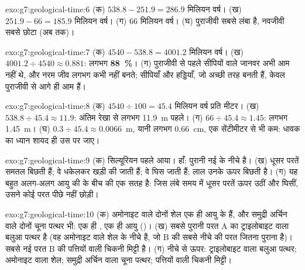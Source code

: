 \begin{solution}{exo:g7:geological-time:6}
(क) $538.8 - 251.9 = 286.9$ मिलियन वर्ष। (ख) $251.9 - 66 = 185.9$
मिलियन वर्ष। (ग) 66 मिलियन वर्ष। (घ) पुराजीवी सबसे लंबा है, नवजीवी सबसे छोटा
(अब तक)।
\end{solution}

\begin{solution}{exo:g7:geological-time:7}
(क) $4540 - 538.8 = 4001.2$ मिलियन वर्ष। (ख) $4001.2 \div 4540
\approx 0.881$:
लगभग \textbf{88~\%}। (ग) पुराजीवी से पहले सीपियों वाले जानवर अभी आम नहीं थे, और
नरम जीव लगभग कभी  नहीं बनते; सीपियाँ और हड्डियाँ, जो अच्छी तरह 
बनती हैं, केवल पुराजीवी से आगे ही आम
हैं।
\end{solution}

\begin{solution}{exo:g7:geological-time:8}
(क) $4540 \div 100 = 45.4$ मिलियन वर्ष प्रति मीटर। (ख) $538.8 \div 45.4
\approx 11.9$:
अंतिम रेखा से लगभग \qty{11.9}{m} पहले। (ग) $66 \div
45.4 \approx 1.45$: लगभग
\qty{1.45}{m}। (घ) $0.3 \div 45.4 \approx
0.0066$~m, यानी लगभग \qty{0.66}{cm},
एक सेंटीमीटर से भी कम: धावक का ध्यान शायद ही उस पर
जाए।
\end{solution}

\begin{solution}{exo:g7:geological-time:9}
(क) सिल्यूरियन पहले आया। हाँ: पुरानी  नई  के नीचे है। (ख) धूसर परतें
समतल बिछती हैं; वे धकेलकर खड़ी की जाती हैं; वे घिस जाती हैं; लाल  उनके ऊपर बिछती
है। (ग) यह बहुत अलग-अलग आयु की  के बीच की एक  सतह है: जिस लंबे समय
में धूसर परतें ऊपर उठीं और घिसीं, उसने कोई परत पीछे नहीं
छोड़ी।
\end{solution}

\begin{solution}{exo:g7:geological-time:10}
(क) अमोनाइट वाले दोनों शेल एक ही आयु के हैं, और समुद्री अर्चिन वाले दोनों चूना
पत्थर भी: एक ही , एक ही आयु ()। (ख) सबसे
पुरानी परत  A का ट्राइलोबाइट वाला बलुआ पत्थर है (वह अमोनाइट वाले शेल के नीचे
है, जो  B की सबसे नीचे की परत जितना पुराना है)। सबसे नई परत  B की
पत्तियों वाली चिकनी मिट्टी है। (ग) नीचे से ऊपर: ट्राइलोबाइट वाला बलुआ पत्थर;
अमोनाइट वाला शेल; समुद्री अर्चिन वाला चूना पत्थर; पत्तियों वाली चिकनी
मिट्टी।
\end{solution}

